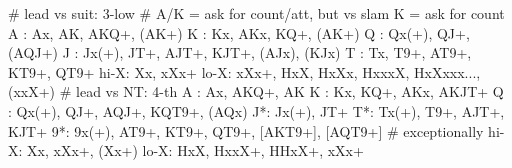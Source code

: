 # lead vs suit: 3-low
# A/K = ask for count/att, but vs slam K = ask for count
A : Ax, AK, AKQ+, (AK+)
K : Kx, AKx, KQ+, (AK+)
Q : Qx(+), QJ+, (AQJ+)
J : Jx(+), JT+, AJT+, KJT+, (AJx), (KJx)
T : Tx, T9+, AT9+, KT9+, QT9+
hi-X: Xx, xXx+
lo-X: xXx+, HxX, HxXx, HxxxX, HxXxxx..., (xxX+)
# lead vs NT: 4-th
A : Ax, AKQ+, AK
K : Kx, KQ+, AKx, AKJT+
Q : Qx(+), QJ+, AQJ+, KQT9+, (AQx)
J*: Jx(+), JT+
T*: Tx(+), T9+, AJT+, KJT+
9*: 9x(+), AT9+, KT9+, QT9+, [AKT9+], [AQT9+]  # exceptionally
hi-X: Xx, xXx+, (Xx+)
lo-X: HxX, HxxX+, HHxX+, xXx+
